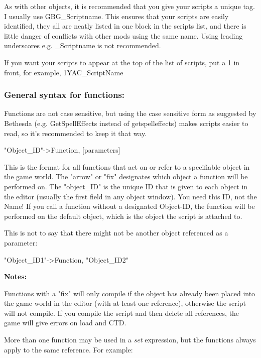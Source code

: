 \documentclass[
]{article}
\begin{document}
As with other objects, it is recommended that you give your scripts a
unique tag. I usually use GBG\_Scriptname. This ensures that your
scripts are easily identified, they all are neatly listed in one block
in the scripts list, and there is little danger of conflicts with other
mods using the same name. Using leading underscores e.g. \_Scriptname is
not recommended.

If you want your scripts to appear at the top of the list of scripts,
put a 1 in front, for example, 1YAC\_ScriptName

\hypertarget{general-syntax-for-functions}{%
\subsubsection{\texorpdfstring{General syntax for functions:
}{General syntax for functions: }}\label{general-syntax-for-functions}}

Functions are not case sensitive, but using the case sensitive form as
suggested by Bethesda (e.g. GetSpellEffects instead of getspelleffects)
makes scripts easier to read, so it's recommended to keep it that way.

"Object\_ID"-\textgreater Function, {[}parameters{]}

This is the format for all functions that act on or refer to a
specifiable object in the game world. The "arrow" or "fix" designates
which object a function will be performed on. The "object\_ID" is the
unique ID that is given to each object in the editor (usually the first
field in any object window). You need this ID, not the Name! If you call
a function without a designated Object-ID, the function will be
performed on the default object, which is the object the script is
attached to.

This is not to say that there might not be another object referenced as
a parameter:

"Object\_ID1"-\textgreater Function, "Object\_ID2"

\textbf{Notes:}

Functions with a "fix" will only compile if the object has already been
placed into the game world in the editor (with at least one reference),
otherwise the script will not compile. If you compile the script and
then delete all references, the game will give errors on load and CTD.

More than one function may be used in a \emph{set} expression, but the
functions always apply to the same reference. For example:
\end{document}
